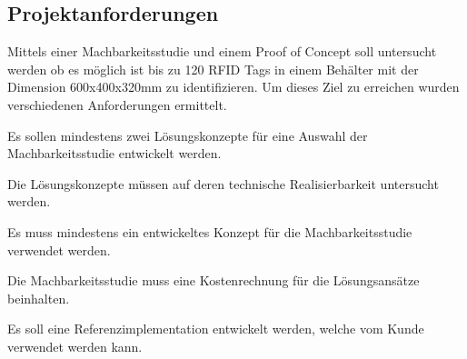 \subsection{Projektanforderungen}
\label{sub:Anforderungen}
Mittels einer Machbarkeitsstudie und einem Proof of Concept soll untersucht werden ob es möglich ist bis zu 120 \gls{RFID} Tags in einem Behälter mit der Dimension 600x400x320mm zu identifizieren.
Um dieses Ziel zu erreichen wurden verschiedenen Anforderungen ermittelt.

\begin{legal}
	\item Es sollen mindestens zwei Lösungskonzepte für eine Auswahl der Machbarkeitsstudie entwickelt werden.
	\item Die Lösungskonzepte müssen auf deren technische Realisierbarkeit untersucht werden.
	\item Es muss mindestens ein entwickeltes Konzept für die Machbarkeitsstudie verwendet werden.
	\item Die Machbarkeitsstudie muss eine Kostenrechnung für die Lösungsansätze beinhalten.
	\item Es soll eine Referenzimplementation entwickelt werden, welche vom Kunde verwendet werden kann.
	

\end{legal}
